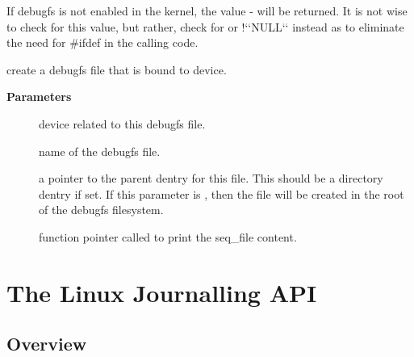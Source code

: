 \documentclass[a4paper,8pt,english]{sphinxmanual}
\begin{document}
If debugfs is not enabled in the kernel, the value - will be
returned.  It is not wise to check for this value, but rather, check for
 or !{}`{}`NULL{}`{}` instead as to eliminate the need for \#ifdef in the calling
code.

\begin{fulllineitems}
\label{filesystems/index:c.debugfs_create_devm_seqfile}
create a debugfs file that is bound to device.

\end{fulllineitems}


\textbf{Parameters}
\begin{description}
\item[{}] \leavevmode
device related to this debugfs file.

\item[{}] \leavevmode
name of the debugfs file.

\item[{}] \leavevmode
a pointer to the parent dentry for this file.  This should be a
directory dentry if set.  If this parameter is , then the
file will be created in the root of the debugfs filesystem.

\item[{}] \leavevmode
function pointer called to print the seq\_file content.

\end{description}


\chapter{The Linux Journalling API}
\label{filesystems/index:the-linux-journalling-api}

\section{Overview}
\label{filesystems/index:overview}
\end{document}
